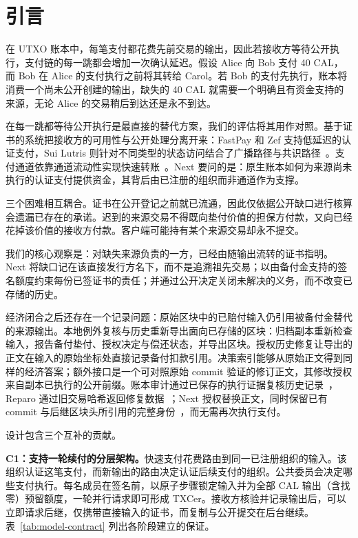 \section{引言}
\label{sec:introduction}

在 UTXO 账本中，每笔支付都花费先前交易的输出，因此若接收方等待公开执行，支付链的每一跳都会增加一次确认延迟。假设 Alice 向 Bob 支付 40 CAL，而 Bob 在 Alice 的支付执行之前将其转给 Carol。若 Bob 的支付先执行，账本将消费一个尚未公开创建的输出，缺失的 40 CAL 就需要一个明确且有资金支持的来源，无论 Alice 的交易稍后到达还是永不到达。

在每一跳都等待公开执行是最直接的替代方案，我们的评估将其用作对照。基于证书的系统把接收方的可用性与公开处理分离开来：FastPay 和 Zef 支持低延迟的认证支付，Sui Lutris 则针对不同类型的状态访问结合了广播路径与共识路径~\cite{fastpay,zef,lutris}。支付通道依靠通道流动性实现快速转账~\cite{blitz,donner}。Next 要问的是：原生账本如何为来源尚未执行的认证支付提供资金，其背后由已注册的组织而非通道作为支撑。

三个困难相互耦合。证书在公开登记之前就已流通，因此仅依据公开缺口进行核算会遗漏已存在的承诺。迟到的来源交易不得既向垫付价值的担保方付款，又向已经花掉该价值的接收方付款。客户端可能持有某个来源交易却永不提交。

我们的核心观察是：对缺失来源负责的一方，已经由随输出流转的证书指明。Next 将缺口记在该直接发行方名下，而不是追溯祖先交易；以由备付金支持的签名额度约束每份已签证书的责任；并通过公开决定关闭未解决的义务，而不改变已存储的历史。

经济闭合之后还存在一个记录问题：原始区块中的已赔付输入仍引用被备付金替代的来源输出。本地例外复核与历史重新导出面向已存储的区块：归档副本重新检查输入，报告备付垫付、授权决定与偿还状态，并导出区块。授权历史修复让导出的正文在输入的原始坐标处直接记录备付扣款引用。决策索引能够从原始正文得到同样的经济答案；额外接口是一个可对照原始 commit 验证的修订正文，其修改授权来自副本已执行的公开前缀。账本审计通过已保存的执行证据复核历史记录~\cite{ia-ccf}，Reparo 通过旧交易哈希返回修复数据~\cite{reparo}；Next 授权替换正文，同时保留已有 commit 与后继区块头所引用的完整身份~\cite{comet-blockid}，而无需再次执行支付。

设计包含三个互补的贡献。

\noindent\textbf{C1：支持一轮续付的分层架构。}快速支付花费路由到同一已注册组织的输入。该组织认证这笔支付，而新输出的路由决定认证后续支付的组织。公共委员会决定哪些支付执行。每名成员在签名前，以原子步骤锁定输入并为全部 CAL 输出（含找零）预留额度，一轮并行请求即可形成 TXCer。接收方核验并记录输出后，可以立即请求后继，仅携带直接输入的证书，而复制与公开提交在后台继续。表~\ref{tab:model-contract} 列出各阶段建立的保证。

